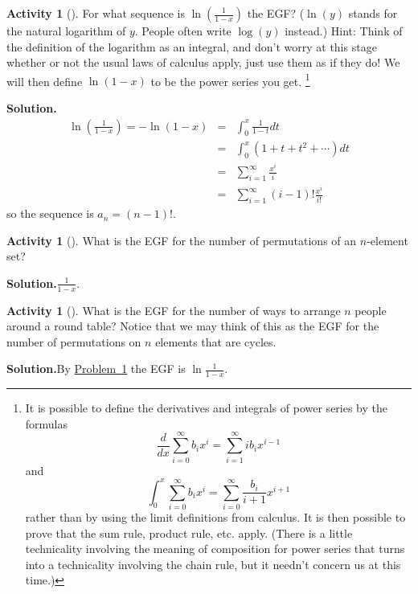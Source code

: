 \documentclass[10pt,]{book}
\theoremstyle{plain}
\theoremstyle{definition}
\newtheorem{activity}[project]{Activity}
\numberwithin{equation}{chapter}
\newcommand{\amp}{&}
\begin{document}
\begin{activity}[]\label{ln1over1-x}
For what sequence is \(\ln(\frac{1}{1-x})\) the EGF? (\(\ln (y)\) stands for the natural logarithm of \(y\). People often write \(\log(y)\) instead.) Hint: Think of the definition of the logarithm as an integral, and don't worry at this stage whether or not the usual laws of calculus apply, just use them as if they do! We will then define \(\ln({ 1-x})\) to be the power series you get. \footnote{It is possible to define the derivatives and integrals of power series by the formulas%
\begin{equation*}
\frac{d}{dx}
\sum_{i=0}^\infty b_ix^i = \sum_{i=1}^\infty ib_ix^{i-1}
\end{equation*}
and%
\begin{equation*}
\int_0^x
\sum_{i=0}^\infty b_ix^i = \sum_{i=0}^\infty \frac{b_i}{i+1}x^{i+1}
\end{equation*}
rather than by using the limit definitions from calculus.  It is then possible to prove that the sum rule, product rule, etc. apply.  (There is a little technicality involving the meaning of composition for power series that turns into a technicality involving the chain rule, but it needn't concern us at this time.)\label{fn-25}}%
\par\medskip\noindent%
\textbf{Solution.}\quad %
\begin{align*}
\ln(\frac{1}{1-x}) =-\ln(1-x) \amp =\amp
\int_0^x \frac{1}{1-t}dt\\
\amp =\amp \int_0^x (1+t+t^2+\cdots)dt\\
\amp =\amp \sum_{i=1}^\infty \frac{x^i}{i}\\
\amp =\amp  \sum_{i=1}^\infty (i-1)!\frac{x^i}{i!}
\end{align*}
so the sequence is \(a_n = (n-1)!\).%
\end{activity}
\begin{activity}[]\label{exponentialpermutations}
What is the EGF for the number of permutations of an \(n\)-element set?%
\par\medskip\noindent%
\textbf{Solution.}\quad \(\frac{1}{ 1-x}\).%
\end{activity}
\begin{activity}[]\label{exponentialroundtable}
What is the EGF for the number of ways to arrange \(n\) people around a round table? Notice that we may think of this as the EGF for the number of permutations on \(n\) elements that are cycles.%
\par\medskip\noindent%
\textbf{Solution.}\quad By \hyperref[ln1over1-x]{Problem~\ref{ln1over1-x}} the EGF is \(\ln\frac{1}{1-x}\).%
\end{activity}
\end{document}
